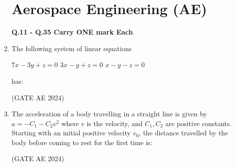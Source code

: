 \documentclass[journal,12pt,onecolumn]{IEEEtran}
\theoremstyle{remark}
\begin{document}
\begin{enumerate}
\begin{enumerate}
\end{enumerate}

\newpage

\section{Aerospace Engineering (AE)}
\textbf{Q.11 - Q.35 Carry ONE mark Each}

\item 
The following system of linear equations  

$7x - 3y + z = 0$  
$3x - y + z = 0$  
$x - y - z = 0$  

has:  
\begin{enumerate}
\end{enumerate}
\hfill(GATE AE 2024)

\item 
The acceleration of a body travelling in a straight line is given by  
$a = -C_1 - C_2 v^2$  
where $v$ is the velocity, and $C_1, C_2$ are positive constants. Starting with an initial positive velocity $v_0$, the distance travelled by the body before coming to rest for the first time is:  


\begin{enumerate}
\end{enumerate}
\hfill(GATE AE 2024)


\end{enumerate}
\end{document}
